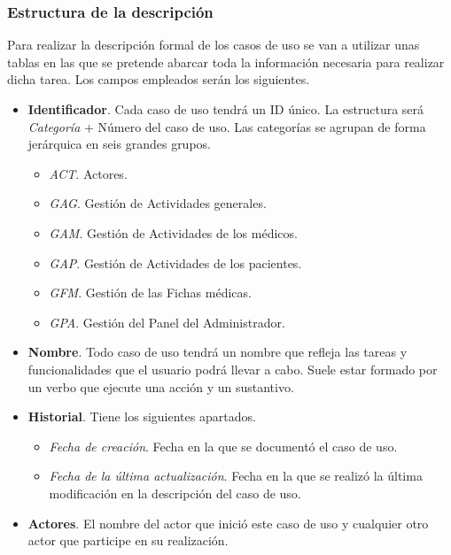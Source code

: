 		\subsubsection{Estructura de la descripción} %
		\label{sub:estructura_de_la_descripcion}
		
			Para realizar la descripción formal de los casos de uso se van a utilizar unas tablas en las que se pretende abarcar toda la información necesaria para realizar dicha tarea. Los campos empleados serán los siguientes.
		
			\begin{itemize}
				\item \textbf{Identificador}. Cada caso de uso tendrá un ID único. La estructura será \textit{Categoría} + Número del caso de uso. Las categorías se agrupan de forma jerárquica en seis grandes grupos.
					\begin{itemize}
						\item \textit{ACT}. Actores.
						\item \textit{GAG}. Gestión de Actividades generales.
						\item \textit{GAM}. Gestión de Actividades de los médicos.
						\item \textit{GAP}. Gestión de Actividades de los pacientes.
						\item \textit{GFM}. Gestión de las Fichas médicas.
						\item \textit{GPA}. Gestión del Panel del Administrador.
					\end{itemize}
				
				\item \textbf{Nombre}. Todo caso de uso tendrá un nombre que refleja las tareas y funcionalidades que el usuario podrá llevar a cabo. Suele estar formado por un verbo que ejecute una acción y un sustantivo.

				\item \textbf{Historial}. Tiene los siguientes apartados.
					\begin{itemize}
						\item \textit{Fecha de creación}. Fecha en la que se documentó el caso de uso.
						\item \textit{Fecha de la última actualización}. Fecha en la que se realizó la última modificación en la descripción del caso de uso.
					\end{itemize}
					
				\item \textbf{Actores}. El nombre del actor que inició este caso de uso y cualquier otro actor que participe en su realización.  
			

\end{itemize}
